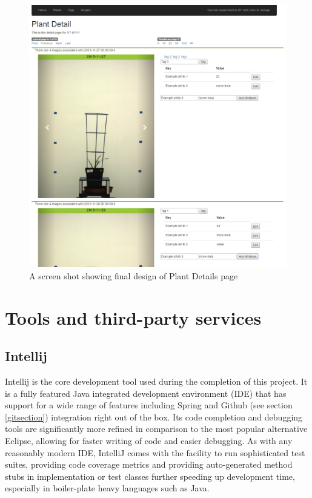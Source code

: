 \begin{figure}[H]
    \centering
    \includegraphics[width=\textwidth]{images/design/ui2}
    \caption{A screen shot showing final design of Plant Details page}
    \label{fig:ui2}
\end{figure}
\section{Tools and third-party services}
\subsection{Intellij}

Intellij \cite{_intellij} is the core development tool used during the completion of this project. It is a fully featured Java integrated development environment (IDE) that has support for a wide range of features including Spring and Github (see section \ref{gitsection}) integration right out of the box. Its code completion and debugging tools are significantly more refined in comparison to the most popular alternative Eclipse, allowing for faster writing of code and easier debugging. As with any reasonably modern IDE, IntelliJ comes with the facility to run sophisticated test suites, providing code coverage metrics and providing auto-generated method stubs in implementation or test classes further speeding up development time, especially in boiler-plate heavy languages such as Java.

